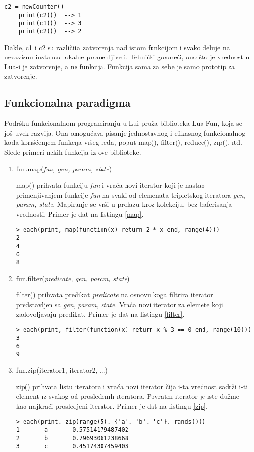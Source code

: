 \documentclass[a4paper]{article}
\begin{document}
\begin{lstlisting}[caption={Zatvorenja},frame=single, label=zatv2]
    c2 = newCounter()
    print(c2())  --> 1
    print(c1())  --> 3
    print(c2())  --> 2
\end{lstlisting}
Dakle, c1 i c2 su različita zatvorenja nad istom funkcijom i svako deluje na nezavisnu instancu lokalne promenljive i. Tehnički govoreći, ono što je vrednost u Lua-i je zatvorenje, a ne funkcija. Funkcija sama za sebe je samo prototip za zatvorenje.

\subsection*{Funkcionalna paradigma}
Podršku funkcionalnom programiranju u Lui pruža biblioteka Lua Fun, koja se još uvek razvija. Ona omogućava pisanje jednostavnog i efikasnog funkcionalnog koda korišćenjem funkcija višeg reda, poput map(), filter(), reduce(), zip(), itd. Slede primeri nekih funkcija iz ove biblioteke.


\begin{enumerate}
  \item  fun.map(\textit{fun, gen, param, state})
  
  map() prihvata funkciju \textit{fun} i vraća novi iterator koji je nastao primenjivanjem funkcije \textit{fun} na svaki od elemenata tripletskog iteratora \textit{gen, param, state}. Mapiranje se vrši u prolazu kroz kolekciju, bez baferisanja vrednosti. Primer je dat na listingu \ref{map}. \cite{luafun}
   \begin{lstlisting}[caption={Primer funkcije map()},frame=single, label=map]
> each(print, map(function(x) return 2 * x end, range(4)))
2
4
6
8
\end{lstlisting}
  \item fun.filter(\textit{predicate, gen, param, state})
  
  filter() prihvata predikat \textit{predicate} na osnovu koga filtrira iterator predstavljen sa \textit{gen, param, state}. Vraća novi iterator za elemete koji zadovoljavaju predikat. Primer je dat na listingu \ref{filter}. \cite{luafun}
   \begin{lstlisting}[caption={Primer funkcije filter()},frame=single, label=filter]
> each(print, filter(function(x) return x % 3 == 0 end, range(10)))
3
6
9
\end{lstlisting}
\item fun.zip(iterator1, iterator2, ...)

   zip() prihvata listu iteratora i vraća novi iterator čija i-ta vrednost sadrži i-ti element iz svakog od prosleđenih iteratora. Povratni iterator je iste dužine kao najkraći prosledjeni iterator. Primer je dat na listingu \ref{zip}. \cite{luafun}
   \begin{lstlisting}[caption={Primer funkcije zip()},frame=single, label=zip]
> each(print, zip(range(5), {'a', 'b', 'c'}, rands()))
1       a       0.57514179487402
2       b       0.79693061238668
3       c       0.45174307459403
\end{lstlisting}
\end{enumerate}
\end{document}
